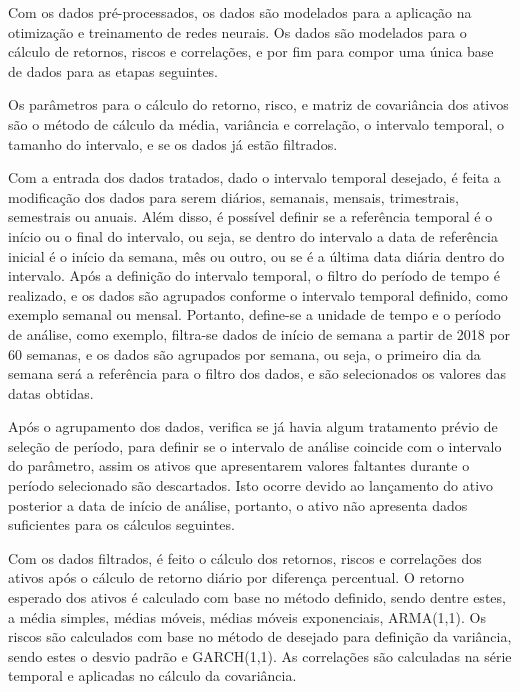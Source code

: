         \ipar Com os dados pré-processados, os dados são modelados para a aplicação na otimização e treinamento de redes neurais. Os dados são modelados para o cálculo de retornos, riscos e correlações, e por fim para compor uma única base de dados para as etapas seguintes.

        \ipar Os parâmetros para o cálculo do retorno, risco, e matriz de covariância dos ativos são o método de cálculo da média, variância e correlação, o intervalo temporal, o tamanho do intervalo, e se os dados já estão filtrados.
        
        \ipar Com a entrada dos dados tratados, dado o intervalo temporal desejado, é feita a modificação dos dados para serem diários, semanais, mensais, trimestrais, semestrais ou anuais. Além disso, é possível definir se a referência temporal é o início ou o final do intervalo, ou seja, se dentro do intervalo a data de referência inicial é o início da semana, mês ou outro, ou se é a última data diária dentro do intervalo. Após a definição do intervalo temporal, o filtro do período de tempo é realizado, e os dados são agrupados conforme o intervalo temporal definido, como exemplo semanal ou mensal. Portanto, define-se a unidade de tempo e o período de análise, como exemplo, filtra-se dados de início de semana a partir de 2018 por 60 semanas, e os dados são agrupados por semana, ou seja, o primeiro dia da semana será a referência para o filtro dos dados, e são selecionados os valores das datas obtidas. 

        \ipar Após o agrupamento dos dados, verifica se já havia algum tratamento prévio de seleção de período, para definir se o intervalo de análise coincide com o intervalo do parâmetro, assim os ativos que apresentarem valores faltantes durante o período selecionado são descartados. Isto ocorre devido ao lançamento do ativo posterior a data de início de análise, portanto, o ativo não apresenta dados suficientes para os cálculos seguintes.

        \ipar Com os dados filtrados, é feito o cálculo dos retornos, riscos e correlações dos ativos após o cálculo de retorno diário por diferença percentual. O retorno esperado dos ativos é calculado com base no método definido, sendo dentre estes, a média simples, médias móveis, médias móveis exponenciais, \acrshort{ARMA}(1,1). Os riscos são calculados com base no método de desejado para definição da variância, sendo estes o desvio padrão e \acrshort{GARCH}(1,1). As correlações são calculadas na série temporal e aplicadas no cálculo da covariância.

